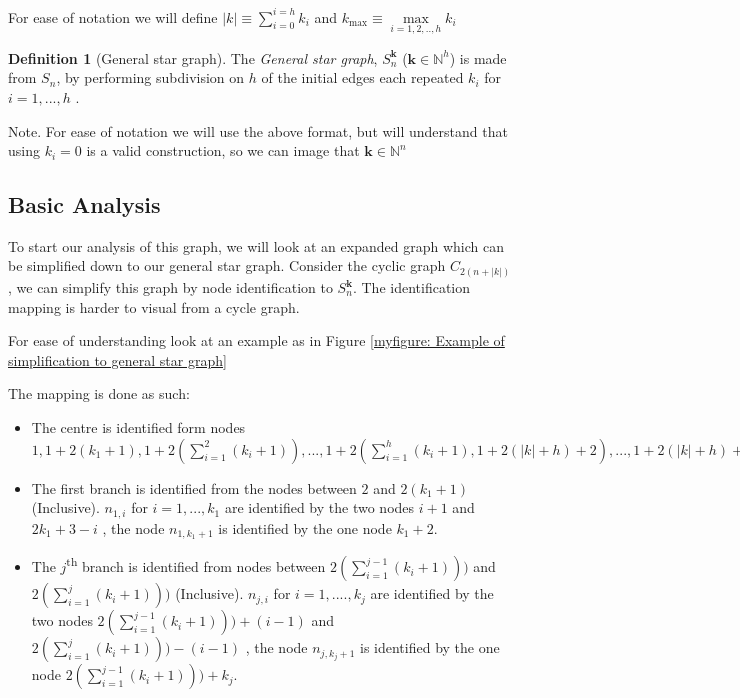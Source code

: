 \documentclass[a4paper,10pt]{article}
\theoremstyle{definition}
\newtheorem{definition}[theorem]{Definition}
\theoremstyle{definition}
\theoremstyle{remark}
\theoremstyle{definition}
\begin{document}
For ease of notation we will define $ |k| \equiv \sum\limits_{i=0}^{i=h} k_{i}$ and $ k_{\max} \equiv \max\limits_{i=1,2,..,h} k_{i}$

\begin{definition}[General star graph]
The \textit{General star graph}, $S^{\bm{k}}_{n}$ ($\bm{k} \in \mathbb{N}^{h}$) is made from $S_{n}$, by performing subdivision on $h$ of the  initial edges each repeated $k_{i}$ for $i=1,...,h$ . 
\end{definition}

Note. For ease of notation we will use the above format, but will understand that using $k_{i}=0$ is a valid construction, so we can image that $\bm{k} \in \mathbb{N}^n$


\subsection{Basic Analysis}
To start our analysis of this graph, we will look at an expanded graph which can be simplified down to our general star graph. Consider the cyclic graph $C_{2(n+|k|)}$ , we can simplify this graph by node identification to $S^{\bm{k}}_{n}$. The identification mapping is harder to visual from a cycle graph.

For ease of understanding look at an example as in Figure \ref{myfigure: Example of simplification to general star graph}

The mapping is done as such:
\begin{itemize}
\item The centre is identified form nodes $1,1+2(k_{1}+1),1+2(\sum\limits_{i=1}^{2} (k_{i}+1)),...,1+2(\sum\limits_{i=1}^{h}(k_{i}+1),1+2(|k|+h)+2),...,1+2(|k|+h)+2(n-h)$

\item The first branch is identified from the nodes between $2$ and $2(k_{1}+1)$ (Inclusive). $n_{1,i}$ for $i=1,...,k_{1}$ are identified by the two nodes $i+1$ and $2k_{1}+3-i$ , the node $n_{1,k_{1}+1}$ is identified by the one node $k_{1}+2$.

\item The $j$\textsuperscript{th} branch is identified from nodes between $2(\sum\limits_{i=1}^{j-1} (k_{i}+1)))$ and $2(\sum\limits_{i=1}^{j} (k_{i}+1)))$ (Inclusive). $n_{j,i}$ for $i=1,....,k_{j}$ are identified by the two nodes $2(\sum\limits_{i=1}^{j-1} (k_{i}+1)))+(i-1)$ and $2(\sum\limits_{i=1}^{j} (k_{i}+1)))-(i-1)$ , the node $n_{j,k_{j}+1}$ is identified by the one node $2(\sum\limits_{i=1}^{j-1} (k_{i}+1)))+k_{j}$.
\end{itemize}
\end{document}
